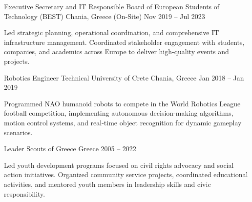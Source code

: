 

\begin{cventries}

  \cventry
    {Executive Secretary and IT Responsible} %
    {Board of European Students of Technology (BEST)} %
    {Chania, Greece (On-Site)} %
    {Nov 2019 -- Jul 2023} %
    {
      \begin{cvitems} %
        \item {Led strategic planning, operational coordination, and comprehensive IT infrastructure management. Coordinated stakeholder engagement with students, companies, and academics across Europe to deliver high-quality events and projects.}
        \end{cvitems}
    }

  \cventry
    {Robotics Engineer} %
    {Technical University of Crete} %
    {Chania, Greece} %
    {Jan 2018 -- Jan 2019} %
    {
      \begin{cvitems} %
        \item {Programmed NAO humanoid robots to compete in the World Robotics League football competition, implementing autonomous decision-making algorithms, motion control systems, and real-time object recognition for dynamic gameplay scenarios.}
        \end{cvitems}
    }

  \cventry
    {Leader} %
    {Scouts of Greece} %
    {Greece} %
    {2005 -- 2022} %
    {
      \begin{cvitems} %
        \item {Led youth development programs focused on civil rights advocacy and social action initiatives. Organized community service projects, coordinated educational activities, and mentored youth members in leadership skills and civic responsibility.}
        \end{cvitems}
    }

\end{cventries}

